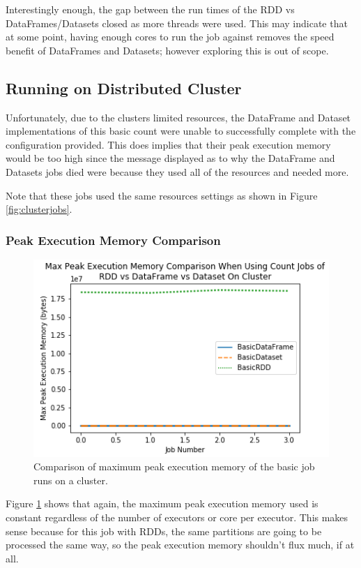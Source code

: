 \documentclass[conference]{IEEEtran}
\begin{document}
Interestingly enough, the gap between the run times of the RDD vs DataFrames/Datasets closed as more threads were used.
This may indicate that at some point, having enough cores to run the job against removes the speed benefit of DataFrames and Datasets; however exploring this is out of scope.

\subsection{Running on Distributed Cluster}
Unfortunately, due to the clusters limited resources, the DataFrame and Dataset implementations of this basic count were unable to successfully complete with the configuration provided.
This does implies that their peak execution memory would be too high since the message displayed as to why the DataFrame and Datasets jobs died were because they used all of the resources and needed more.

Note that these jobs used the same resources settings as shown in Figure \ref{fig:clusterjobs}.

\subsubsection{Peak Execution Memory Comparison}
\begin{figure}
    \includegraphics[width=\linewidth]{../python_scripts/images/basicJobsMaxPeakExecutionMemoryCluster.png}
    \caption{Comparison of maximum peak execution memory of the basic job runs on a cluster.}
    \label{fig:basicJobsMaxPeakExecutionMemoryCluster}
\end{figure}

Figure \ref{fig:basicJobsMaxPeakExecutionMemoryCluster} shows that again, the maximum peak execution memory used is constant regardless of the number of executors or core per executor.
This makes sense because for this job with RDDs, the same partitions are going to be processed the same way, so the peak execution memory shouldn't flux much, if at all.
\end{document}
